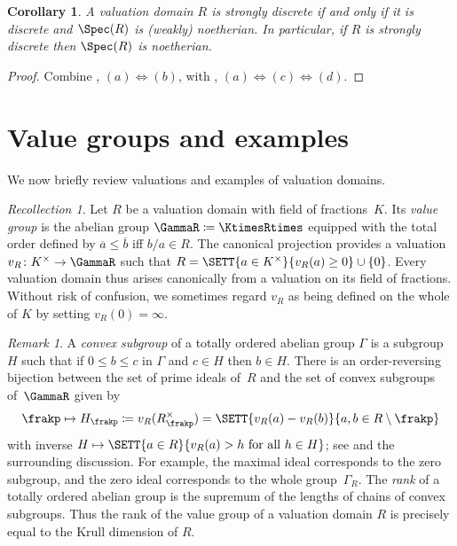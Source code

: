 \documentclass{amsart}
\numberwithin{equation}{section}%
\newtheorem{Cor}[equation]{Corollary}
\theoremstyle{remark}
\newtheorem{Rem}[equation]{Remark}
\newtheorem{Rec}[equation]{Recollection}
\begin{document}
\begin{Cor}\label{cor:strongly-discrete-noetherian}
	A valuation domain $R$ is strongly discrete if and only if it is discrete and $\Spec(R)$ is (weakly) noetherian. In particular, if $R$ is strongly discrete then $\Spec(R)$ is noetherian.
\end{Cor}

\begin{proof}
	Combine , $(a)\Leftrightarrow(b)$, with , $(a)\Leftrightarrow(c)\Leftrightarrow(d)$.
\end{proof}

\section{Value groups and examples}\label{sec:value-groups}

We now briefly review valuations and examples of valuation domains.

\begin{Rec}\label{rec:value-group}
	Let $R$ be a valuation domain with field of fractions~$K$. Its \emph{value group} is the abelian group $\GammaR \coloneqq \KtimesRtimes$ equipped with the total order defined by $\overbar{a} \le \overbar{b}$ iff $b/a \in R$. The canonical projection provides a valuation $v_R\colon K^\times \to \GammaR$ such that $R=\SETT{a \in K^\times}{v_R(a) \ge 0}\cup\{0\}$. Every valuation domain thus arises canonically from a valuation on its field of fractions. Without risk of confusion, we sometimes regard $v_R$ as being defined on the whole of $K$ by setting $v_R(0)=\infty$.
\end{Rec}

\begin{Rem}\label{rem:convex}
	A \emph{convex subgroup} of a totally ordered abelian group $\Gamma$ is a subgroup~$H$ such that if $0 \le b \le c$ in $\Gamma$ and $c\in H$ then $b \in H$. There is an order-reversing bijection between the set of prime ideals of~$R$ and the set of convex subgroups of~$\GammaR$ given by
	\[
		\frakp \mapsto H_\frakp \coloneqq  v_R(R_{\frakp}^{\times}) = \SETT{v_R(a) - v_R(b)}{a,b \in R \setminus \frakp}
	\]
	with inverse $H\mapsto\SETT{a \in R}{v_R(a) > h \text{ for all }h\in H}$; see \cite[Proposition~II.3.4]{FuchsSalce01} and the surrounding discussion. For example, the maximal ideal corresponds to the zero subgroup, and the zero ideal corresponds to the whole group~$\Gamma_R$. The \emph{rank} of a totally ordered abelian group is the supremum of the lengths of chains of convex subgroups. Thus the rank of the value group of a valuation domain $R$ is precisely equal to the Krull dimension of $R$.
\end{Rem}
\end{document}
